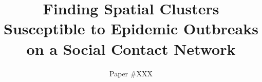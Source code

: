 \documentclass[sigconf]{aamas}  %
\begin{document}
\title{Finding Spatial Clusters Susceptible to Epidemic Outbreaks on a Social Contact Network}


\author{Paper \#XXX}  %

%
%
%
%
%
%
%
%
\end{document}
